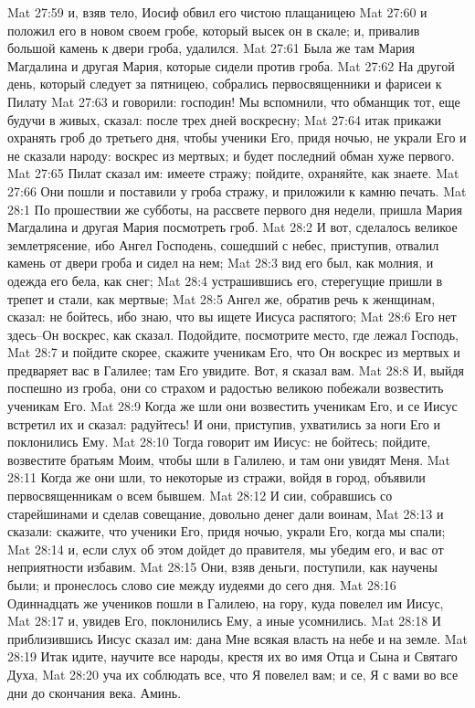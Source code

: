 Mat 27:59  и, взяв тело, Иосиф обвил его чистою плащаницею
Mat 27:60  и положил его в новом своем гробе, который высек он в скале; и, привалив большой камень к двери гроба, удалился.
Mat 27:61  Была же там Мария Магдалина и другая Мария, которые сидели против гроба.
Mat 27:62  На другой день, который следует за пятницею, собрались первосвященники и фарисеи к Пилату
Mat 27:63  и говорили: господин! Мы вспомнили, что обманщик тот, еще будучи в живых, сказал: после трех дней воскресну;
Mat 27:64  итак прикажи охранять гроб до третьего дня, чтобы ученики Его, придя ночью, не украли Его и не сказали народу: воскрес из мертвых; и будет последний обман хуже первого.
Mat 27:65  Пилат сказал им: имеете стражу; пойдите, охраняйте, как знаете.
Mat 27:66  Они пошли и поставили у гроба стражу, и приложили к камню печать.
Mat 28:1  По прошествии же субботы, на рассвете первого дня недели, пришла Мария Магдалина и другая Мария посмотреть гроб.
Mat 28:2  И вот, сделалось великое землетрясение, ибо Ангел Господень, сошедший с небес, приступив, отвалил камень от двери гроба и сидел на нем;
Mat 28:3  вид его был, как молния, и одежда его бела, как снег;
Mat 28:4  устрашившись его, стерегущие пришли в трепет и стали, как мертвые;
Mat 28:5  Ангел же, обратив речь к женщинам, сказал: не бойтесь, ибо знаю, что вы ищете Иисуса распятого;
Mat 28:6  Его нет здесь--Он воскрес, как сказал. Подойдите, посмотрите место, где лежал Господь,
Mat 28:7  и пойдите скорее, скажите ученикам Его, что Он воскрес из мертвых и предваряет вас в Галилее; там Его увидите. Вот, я сказал вам.
Mat 28:8  И, выйдя поспешно из гроба, они со страхом и радостью великою побежали возвестить ученикам Его.
Mat 28:9  Когда же шли они возвестить ученикам Его, и се Иисус встретил их и сказал: радуйтесь! И они, приступив, ухватились за ноги Его и поклонились Ему.
Mat 28:10  Тогда говорит им Иисус: не бойтесь; пойдите, возвестите братьям Моим, чтобы шли в Галилею, и там они увидят Меня.
Mat 28:11  Когда же они шли, то некоторые из стражи, войдя в город, объявили первосвященникам о всем бывшем.
Mat 28:12  И сии, собравшись со старейшинами и сделав совещание, довольно денег дали воинам,
Mat 28:13  и сказали: скажите, что ученики Его, придя ночью, украли Его, когда мы спали;
Mat 28:14  и, если слух об этом дойдет до правителя, мы убедим его, и вас от неприятности избавим.
Mat 28:15  Они, взяв деньги, поступили, как научены были; и пронеслось слово сие между иудеями до сего дня.
Mat 28:16  Одиннадцать же учеников пошли в Галилею, на гору, куда повелел им Иисус,
Mat 28:17  и, увидев Его, поклонились Ему, а иные усомнились.
Mat 28:18  И приблизившись Иисус сказал им: дана Мне всякая власть на небе и на земле.
Mat 28:19  Итак идите, научите все народы, крестя их во имя Отца и Сына и Святаго Духа,
Mat 28:20  уча их соблюдать все, что Я повелел вам; и се, Я с вами во все дни до скончания века. Аминь.


